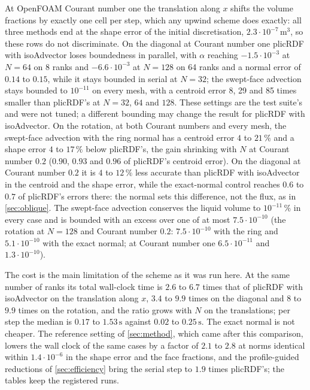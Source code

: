 \documentclass[preprint,12pt]{elsarticle}
\begin{document}
At OpenFOAM Courant number one the translation along $x$ shifts the volume fractions by exactly one cell per step, which any upwind scheme does exactly: all three methods end at the shape error of the initial discretisation, $2.3\cdot10^{-7}\,\mathrm{m^3}$, so these rows do not discriminate. On the diagonal at Courant number one plicRDF with isoAdvector loses boundedness in parallel, with $\alpha$ reaching $-1.5\cdot10^{-3}$ at $N = 64$ on 8 ranks and $-6.6\cdot10^{-3}$ at $N = 128$ on 64 ranks and a normal error of $0.14$ to $0.15$, while it stays bounded in serial at $N = 32$; the swept-face advection stays bounded to $10^{-11}$ on every mesh, with a centroid error 8, 29 and 85 times smaller than plicRDF's at $N = 32$, $64$ and $128$. These settings are the test suite's and were not tuned; a different bounding may change the result for plicRDF with isoAdvector. On the rotation, at both Courant numbers and every mesh, the swept-face advection with the ring normal has a centroid error $4$ to $21\,\%$ and a shape error $4$ to $17\,\%$ below plicRDF's, the gain shrinking with $N$ at Courant number $0.2$ ($0.90$, $0.93$ and $0.96$ of plicRDF's centroid error). On the diagonal at Courant number $0.2$ it is $4$ to $12\,\%$ less accurate than plicRDF with isoAdvector in the centroid and the shape error, while the exact-normal control reaches $0.6$ to $0.7$ of plicRDF's errors there: the normal sets this difference, not the flux, as in \cref{sec:oblique}. The swept-face advection conserves the liquid volume to $10^{-11}\,\%$ in every case and is bounded with an excess over one of at most $7.5\cdot10^{-10}$ (the rotation at $N = 128$ and Courant number $0.2$: $7.5\cdot10^{-10}$ with the ring and $5.1\cdot10^{-10}$ with the exact normal; at Courant number one $6.5\cdot10^{-11}$ and $1.3\cdot10^{-10}$).

The cost is the main limitation of the scheme as it was run here. At the same number of ranks its total wall-clock time is $2.6$ to $6.7$ times that of plicRDF with isoAdvector on the translation along $x$, $3.4$ to $9.9$ times on the diagonal and $8$ to $9.9$ times on the rotation, and the ratio grows with $N$ on the translations; per step the median is $0.17$ to $1.53\,\mathrm{s}$ against $0.02$ to $0.25\,\mathrm{s}$. The exact normal is not cheaper. The reference setting of \cref{sec:method}, which came after this comparison, lowers the wall clock of the same cases by a factor of $2.1$ to $2.8$ at norms identical within $1.4\cdot10^{-6}$ in the shape error and the face fractions, and the profile-guided reductions of \cref{sec:efficiency} bring the serial step to $1.9$ times plicRDF's; the tables keep the registered runs.
\end{document}
